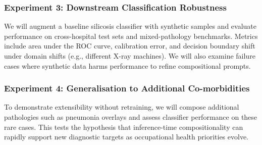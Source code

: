 \subsubsection{Experiment 3: Downstream Classification Robustness}
We will augment a baseline silicosis classifier with synthetic samples and evaluate performance on cross-hospital test sets and mixed-pathology benchmarks. Metrics include area under the ROC curve, calibration error, and decision boundary shift under domain shifts (e.g., different X-ray machines). We will also examine failure cases where synthetic data harms performance to refine compositional prompts.

\subsubsection{Experiment 4: Generalisation to Additional Co-morbidities}
To demonstrate extensibility without retraining, we will compose additional pathologies such as pneumonia overlays and assess classifier performance on these rare cases. This tests the hypothesis that inference-time compositionality can rapidly support new diagnostic targets as occupational health priorities evolve.
